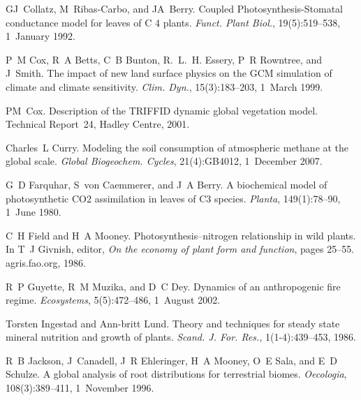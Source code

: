 \begin{DoxyDescription}
\item[\label{_CITEREF_Collatz1992-jf}%
\mbox{[}16\mbox{]}]G\+J~Collatz, M~Ribas-\/\+Carbo, and J\+A~Berry. Coupled Photosynthesis-\/\+Stomatal conductance model for leaves of C 4 plants. {\itshape Funct. Plant Biol.}, 19(5)\+:519--538, 1~January 1992. 


\item[\label{_CITEREF_Cox1999-ia}%
\mbox{[}17\mbox{]}]P~M Cox, R~A Betts, C~B Bunton, R.~L.~H. Essery, P~R Rowntree, and J~Smith. The impact of new land surface physics on the G\+C\+M simulation of climate and climate sensitivity. {\itshape Clim. Dyn.}, 15(3)\+:183--203, 1~March 1999. 


\item[\label{_CITEREF_Cox2001-am}%
\mbox{[}18\mbox{]}]P\+M~Cox. Description of the T\+R\+I\+F\+F\+I\+D dynamic global vegetation model. Technical Report~24, Hadley Centre, 2001.


\item[\label{_CITEREF_Curry2007-du}%
\mbox{[}19\mbox{]}]Charles~L Curry. Modeling the soil consumption of atmospheric methane at the global scale. {\itshape Global Biogeochem. Cycles}, 21(4)\+:G\+B4012, 1~December 2007. 


\item[\label{_CITEREF_Farquhar1980-96e}%
\mbox{[}20\mbox{]}]G~D Farquhar, S~von Caemmerer, and J~A Berry. A biochemical model of photosynthetic C\+O2 assimilation in leaves of C3 species. {\itshape Planta}, 149(1)\+:78--90, 1~June 1980. 


\item[\label{_CITEREF_Field1986-kd}%
\mbox{[}21\mbox{]}]C~H Field and H~A Mooney. Photosynthesis--nitrogen relationship in wild plants. In T~J Givnish, editor, {\itshape On the economy of plant form and function}, pages 25--55. agris.\+fao.\+org, 1986.


\item[\label{_CITEREF_Guyette2002-rc}%
\mbox{[}22\mbox{]}]R~P Guyette, R~M Muzika, and D~C Dey. Dynamics of an anthropogenic fire regime. {\itshape Ecosystems}, 5(5)\+:472--486, 1~August 2002. 


\item[\label{_CITEREF_Ingestad1986-td}%
\mbox{[}23\mbox{]}]Torsten Ingestad and Ann-\/britt Lund. Theory and techniques for steady state mineral nutrition and growth of plants. {\itshape Scand. J. For. Res.}, 1(1-\/4)\+:439--453, 1986. 


\item[\label{_CITEREF_Jackson1996-va}%
\mbox{[}24\mbox{]}]R~B Jackson, J~Canadell, J~R Ehleringer, H~A Mooney, O~E Sala, and E~D Schulze. A global analysis of root distributions for terrestrial biomes. {\itshape Oecologia}, 108(3)\+:389--411, 1~November 1996. 



\end{DoxyDescription}
